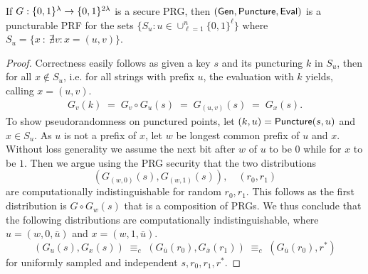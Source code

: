 \begin{theorem}
	\label{theo:KPTZ13:prefix_punctured_prf}
	If $G : \{0,1\}^\lambda \to \{0,1\}^{2\lambda}$ is a secure PRG, then $(\mathsf{Gen}, \allowbreak \mathsf{Puncture}, \allowbreak \mathsf{Eval})$ is a puncturable PRF for the sets $\{S_u : u \in \cup_{\ell = 1}^n \{0,1\}^\ell\}$ where $S_u = \{x \: : \: \nexists v : x = (u, v)\}$.
\end{theorem}
\begin{proof}
	Correctness easily follows as given a key $s$ and its puncturing $k$ in $S_u$, then for all $x \notin S_u$, i.e. for all strings with prefix $u$, the evaluation with $k$ yields, calling $x = (u, v)$.
	\begin{align*}
		G_{v}(k)
			\; = \;
		G_v \circ G_u (s)
			\; = \;
		G_{(u,v)}(s)
			\; = \;
		G_x(s).
	\end{align*}
	To show pseudorandomness on punctured points, let $(k,u) = \mathsf{Puncture}(s, u)$ and $x \in S_u$. As $u$ is not a prefix of $x$, let $w$ be longest common prefix of $u$ and $x$.
	Without loss generality we assume the next bit after $w$ of $u$ to be $0$ while for $x$ to be $1$.
	Then we argue using the PRG security that the two distributions
	\[
		(G_{(w,0)}(s), G_{(w,1)}(s))
			, \quad
		(r_0, r_1)
	\]
	are computationally indistinguishable for random $r_0, r_1$. This follows as the first distribution is $G \circ G_w(s)$ that is a composition of PRGs.
	We thus conclude that the following distributions are computationally indistinguishable, where $u = (w, 0, \bar{u})$ and $x = (w, 1, \bar{u})$.
	\[
		\left( G_u(s),  G_x(s) \right)
			\; \equiv_c \;
		\left( G_{\bar{u}}(r_0), G_{\bar{x}}(r_1) \right)
			\; \equiv_c \;
		\left( G_{\bar{u}}(r_0), r^\ast \right)
	\]
	for uniformly sampled and independent $s, r_0, r_1, r^\ast$.
\end{proof}